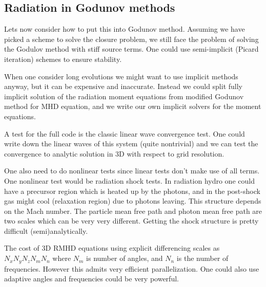 \documentclass[letterpaper, 11pt]{article}
\numberwithin{equation}{section}
\numberwithin{figure}{section}
\begin{document}
\subsection{Radiation in Godunov methods}

Lets now consider how to put this into Godunov method. Assuming we have picked a
scheme to solve the closure problem, we still face the problem of solving the
Godulov method with stiff source terms. One could use semi-implicit (Picard
iteration) schemes to ensure stability.

When one consider long evolutions we might want to use implicit methods anyway,
but it can be expensive and inaccurate. Instead we could split fully implicit
solution of the radiation moment equations from modified Godunov method for MHD
equation, and we write our own implicit solvers for the moment equations.

A test for the full code is the classic linear wave convergence test. One could
write down the linear waves of this system (quite nontrivial) and we can test
the convergence to analytic solution in 3D with respect to grid resolution.

One also need to do nonlinear tests since linear tests don't make use of all
terms. One nonlinear test would be radiation shock tests. In radiation hydro one
could have a precursor region which is heated up by the photons, and in the
post-shock gas might cool (relaxation region) due to photons leaving. This
structure depends on the Mach number. The particle mean free path and photon
mean free path are two scales which can be very very different. Getting the
shock structure is pretty difficult (semi)analytically.

The cost of 3D RMHD equations using explicit differencing scales as
$N_xN_yN_zN_mN_n$ where $N_m$ is number of angles, and $N_n$ is the number of
frequencies. However this admits very efficient parallelization. One could also
use adaptive angles and frequencies could be very powerful.
\end{document}
